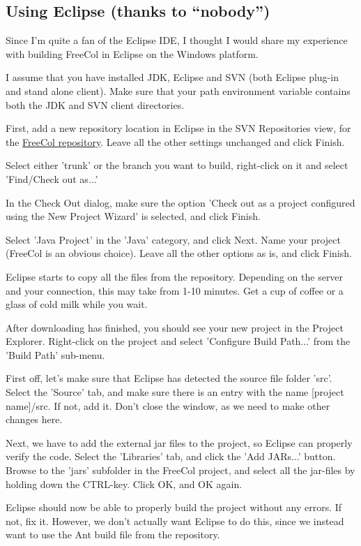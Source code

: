 \documentclass[12pt]{book}
\begin{document}
\hypertarget{Using Eclipse}{\subsection{Using Eclipse (thanks to ``nobody'')}}

Since I'm quite a fan of the Eclipse IDE, I thought I would share my
experience with building FreeCol in Eclipse on the Windows platform.

I assume that you have installed JDK, Eclipse and SVN (both Eclipse
plug-in and stand alone client). Make sure that your path environment
variable contains both the JDK and SVN client directories.

First, add a new repository location in Eclipse in the SVN
Repositories view, for the
\href{https://svn.freecol.org/svnroot/freecol/freecol/}{FreeCol
  repository}. Leave all the other settings unchanged and click
Finish.

Select either 'trunk' or the branch you want to build, right-click on
it and select 'Find/Check out as...'

In the Check Out dialog, make sure the option 'Check out as a project
configured using the New Project Wizard' is selected, and click
Finish.

Select 'Java Project' in the 'Java' category, and click Next. Name
your project (FreeCol is an obvious choice). Leave all the other
options as is, and click Finish.

Eclipse starts to copy all the files from the repository. Depending on
the server and your connection, this may take from 1-10 minutes. Get a
cup of coffee or a glass of cold milk while you wait.

After downloading has finished, you should see your new project in the
Project Explorer. Right-click on the project and select 'Configure
Build Path...' from the 'Build Path' sub-menu.

First off, let's make sure that Eclipse has detected the source file
folder 'src'. Select the 'Source' tab, and make sure there is an entry
with the name [project name]/src. If not, add it. Don't close the
window, as we need to make other changes here.

Next, we have to add the external jar files to the project, so Eclipse
can properly verify the code. Select the 'Libraries' tab, and click
the 'Add JARs...' button. Browse to the 'jars' subfolder in the
FreeCol project, and select all the jar-files by holding down the
CTRL-key. Click OK, and OK again.

Eclipse should now be able to properly build the project without any
errors. If not, fix it. However, we don't actually want Eclipse to do
this, since we instead want to use the Ant build file from the
repository.
\end{document}
